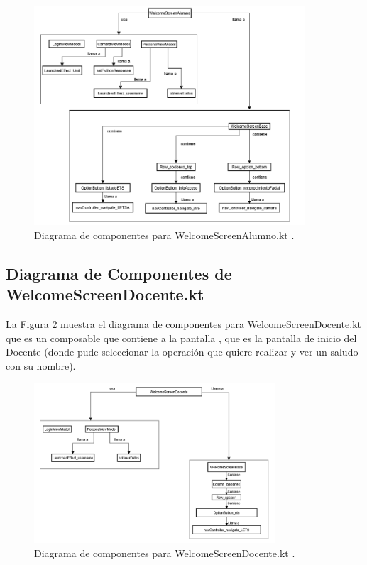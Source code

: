 \begin{figure}[htbp!]
	\begin{center}
		\includegraphics[width=0.9\textwidth]{DiagramasMoviles/DCM (35)}
		\caption{Diagrama de componentes para WelcomeScreenAlumno.kt .}
		\label{fig:Componentes_22}
	\end{center}
\end{figure}

\newpage

\subsection{Diagrama de Componentes de WelcomeScreenDocente.kt}

La Figura \ref{fig:Componentes_23} muestra el diagrama de componentes para WelcomeScreenDocente.kt que es un composable que contiene a la pantalla , que es la pantalla de inicio del Docente (donde pude seleccionar la operación que quiere realizar y ver un saludo con su nombre).

\begin{figure}[htbp!]
	\begin{center}
		\includegraphics[width=0.8\textwidth]{DiagramasMoviles/DCM (36)}
		\caption{Diagrama de componentes para WelcomeScreenDocente.kt .}
		\label{fig:Componentes_23}
	\end{center}
\end{figure}